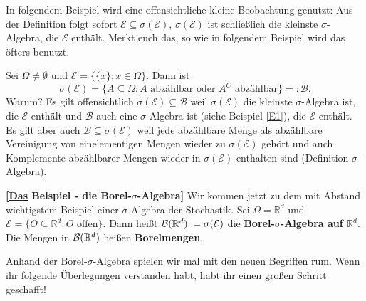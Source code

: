 In folgendem Beispiel wird eine offensichtliche kleine Beobachtung genutzt: Aus der Definition folgt sofort $\mathcal E\subseteq \sigma(\mathcal E)$, $\sigma(\mathcal E)$ ist schlie\ss lich die kleinste $\sigma$-Algebra, die $\mathcal E$ enth\"alt. Merkt euch das, so wie in folgendem Beispiel wird das \"ofters benutzt.
\begin{beispiel} 
	Sei $\Omega \neq \emptyset$ und $\mathcal E=\{ \{ x \} \! : x\in \Omega \}$. Dann ist \[ \sigma(\mathcal E)= \{ A \subseteq \Omega \! : \text{$A$ abzählbar oder $A^C$ abzählbar}\}=:\mathcal B . \]
	Warum? Es gilt offensichtlich $\sigma(\mathcal E) \subseteq \mathcal B$ weil $\sigma(\mathcal E)$ die kleinste $\sigma$-Algebra ist, die $\mathcal E$ enth\"alt und $\mathcal B$ auch eine $\sigma$-Algebra ist (siehe Beispiel \ref{E1}), die $\mathcal E$ enth\"alt. Es gilt aber auch $\mathcal B \subseteq \sigma(\mathcal E)$ weil jede abzählbare Menge als abzählbare Vereinigung von einelementigen Mengen wieder zu $\sigma(\mathcal E)$ gehört und auch Komplemente abzählbarer Mengen wieder in $\sigma(\mathcal E)$ enthalten sind (Definition $\sigma$-Algebra).
\end{beispiel}

\begin{beispiel}  \textbf{[\underline{Das} Beispiel - die Borel-$\sigma$-Algebra]}
Wir kommen jetzt zu dem mit Abstand wichtigstem Beispiel einer $\sigma$-Algebra der Stochastik. Sei $\Omega = \mathbb{R}^d$ und $\mathcal E = \{ O \subseteq \mathbb{R}^d \! : O \text{ offen} \}$. Dann heißt $\mathcal{B}(\mathbb{R}^d):= \sigma(\mathcal E)$ die \textbf{Borel-$\sigma$-Algebra auf $\mathbb{R}^d$}. Die Mengen in $\mathcal{B}(\mathbb{R}^d)$ hei\ss en \textbf{Borelmengen}.
\end{beispiel}
Anhand der Borel-$\sigma$-Algebra spielen wir mal mit den neuen Begriffen rum. Wenn ihr folgende \"Uberlegungen verstanden habt, habt ihr einen gro\ss en Schritt geschafft! \smallskip

